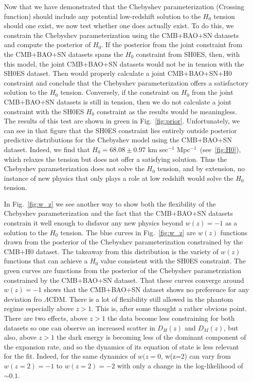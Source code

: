 \documentclass[
 reprint,
 amsmath,amssymb,
 aps,
]{revtex4-2}
\begin{document}
Now that we have demonstrated that the Chebyshev parameterization (Crossing function) should include any potential low-redshift solution to the $H_0$ tension should one exist, we now test whether one does actually exist. To do this, we constrain the Chebyshev parameterization using the CMB+BAO+SN datasets and compute the posterior of $H_0$.  If the posterior from the joint constraint from the CMB+BAO+SN datasets spans the $H_0$ constraint from SH0ES, then, with this model, the joint CMB+BAO+SN datasets would not be in tension with the SH0ES dataset.  Then would properly calculate a joint CMB+BAO+SN+H0 constraint and conclude that the Chebyshev parameterization offers a satisfactory solution to the $H_0$ tension. Conversely, if the constraint on $H_0$ from the joint CMB+BAO+SN datasets is still in tension, then we do not calculate a joint constraint with the SH0ES $H_0$ constraint as the results would be meaningless. The results of this test are shown in green in Fig.~\ref{fig:prior}. Unfortunately, we can see in that figure that the SH0ES constraint lies entirely outside posterior predictive distributions for the Chebyshev model using the CMB+BAO+SN dataset.  Indeed, we find that $H_0 = 68.08 \pm 0.97$ km sec$^{-1}$ Mpc$^{-1}$~(see~\ref{fig:H0}), which relaxes the tension but does not offer a satisfying solution.  Thus the Chebyshev parameterization does not solve the $H_0$ tension, and by extension, no instance of new physics that only plays a role at low redshift would solve the $H_0$ tension. 

In Fig.~\ref{fig:w_z} we see another way to show both the flexibility of the Chebyshev parameterization and the fact that the CMB+BAO+SN datasets constrain it well enough to disfavor any new physics beyond $w(z)=-1$ as a solution to the $H_0$ tension.  The blue curves in Fig.~\ref{fig:w_z} are $w(z)$ functions drawn from the posterior of the Chebyshev parameterization constrained by the CMB+H0 dataset.  The takeaway from this distribution is the variety of $w(z)$ functions that can achieve a $H_0$ value consistent with the SH0ES constraint.  The green curves are functions from the posterior of the Chebyshev parametrziation constrained by the CMB+BAO+SN dataset. That these curves converge around $w(z)=-1$ shows that the CMB+BAO+SN dataset shows no preference for any deviation fro $\Lambda$CDM.  There is a lot of flexibility still allowed in the phantom regime especially above $z>1$.  This is, after some thought a rather obvious point.  There are two effects, above $z>1$ the data become less constraining for both datasets so one can observe an increased scatter in $D_H(z)$ and $D_M(z)$, but also, above $z>1$ the dark energy is becoming less of the dominant component of the expansion rate, and so the dynamics of its equation of state is less relevant for the fit.  Indeed, for the same dynamics of $w(z=0$, w(z=2) can vary from $w(z=2) = -1$ to $w(z=2) = -2$ with only a change in the log-likelihood of $\sim 0.1$.
\end{document}
